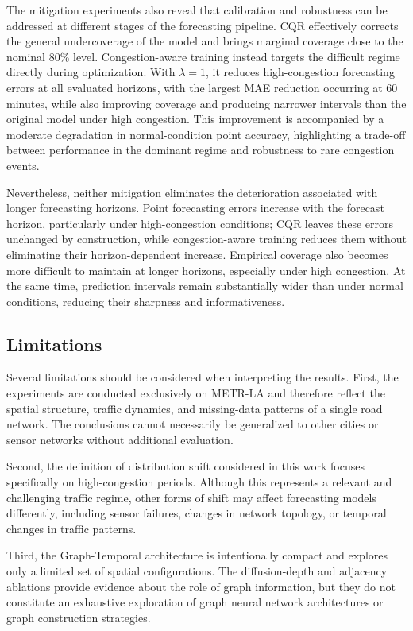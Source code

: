 The mitigation experiments also reveal that calibration and robustness can be
addressed at different stages of the forecasting pipeline. CQR effectively
corrects the general undercoverage of the model and brings marginal coverage
close to the nominal 80\% level. Congestion-aware training instead targets
the difficult regime directly during optimization. With $\lambda=1$, it
reduces high-congestion forecasting errors at all evaluated horizons, with
the largest MAE reduction occurring at 60 minutes, while also improving
coverage and producing narrower intervals than the original model under
high congestion. This improvement is accompanied by a moderate degradation
in normal-condition point accuracy, highlighting a trade-off between
performance in the dominant regime and robustness to rare congestion events.

Nevertheless, neither mitigation eliminates the deterioration associated with
longer forecasting horizons. Point forecasting errors increase with the
forecast horizon, particularly under high-congestion conditions; CQR leaves
these errors unchanged by construction, while congestion-aware training
reduces them without eliminating their horizon-dependent increase. Empirical
coverage also becomes more difficult to maintain at longer horizons,
especially under high congestion. At the same time, prediction intervals
remain substantially wider than under normal conditions, reducing their
sharpness and informativeness.


\subsection{Limitations}
\label{subsec:limitations}

Several limitations should be considered when interpreting the results.
First, the experiments are conducted exclusively on METR-LA and therefore
reflect the spatial structure, traffic dynamics, and missing-data patterns of
a single road network. The conclusions cannot necessarily be generalized to
other cities or sensor networks without additional evaluation.

Second, the definition of distribution shift considered in this work focuses
specifically on high-congestion periods. Although this represents a relevant
and challenging traffic regime, other forms of shift may affect forecasting
models differently, including sensor failures, changes in network topology,
or temporal changes in traffic patterns.

Third, the Graph-Temporal architecture is intentionally compact and explores
only a limited set of spatial configurations. The diffusion-depth and
adjacency ablations provide evidence about the role of graph information, but
they do not constitute an exhaustive exploration of graph neural network
architectures or graph construction strategies.

